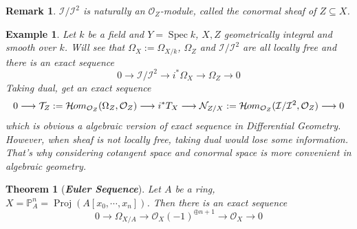 \documentclass{ctexart}
\newtheorem{remark}{Remark}[section]
\newtheorem{theorem}{Theorem}[section]
\newtheorem{example}{Example}[section]
\newcommand{\sheafhom}{\mathcal{H}\kern -.5pt om}
\newcommand{\spec}{\operatorname{Spec}}
\newcommand{\proj}{\operatorname{Proj}}
\begin{document}
\begin{remark}
    $\mathcal{I}/\mathcal{I}^{2}$ is naturally an $\mathcal{O}_{Z}$-module, called the conormal sheaf of $Z \subseteq X$.
\end{remark}
\begin{example}
    Let $k$ be a field and $Y = \spec k$, $X,Z$ geometrically integral and smooth over $k$.
    Will see that $\Omega_{X} := \Omega_{X/k}$, $\Omega_{Z}$ and $\mathcal{I}/\mathcal{I}^{2}$ are all locally free and there is an exact sequence
    \begin{equation*}
        0 \longrightarrow \mathcal{I}/\mathcal{I}^{2} \longrightarrow i^{\ast}\Omega_{X} \longrightarrow \Omega_{Z} \longrightarrow 0
    \end{equation*}
    Taking dual, get an exact sequence
    \begin{equation*}
        0 \longrightarrow \mathcal{T}_{Z} := \sheafhom_{\mathcal{O}_{Z}}(\Omega_{Z}, \mathcal{O}_{Z}) \longrightarrow i^{\ast}T_{X} \longrightarrow \mathcal{N}_{Z/X} := \sheafhom_{\mathcal{O}_{Z}}(\mathcal{I}/\mathcal{I}^{2}, \mathcal{O}_{Z}) \longrightarrow 0
    \end{equation*}
    which is obvious a algebraic version of exact sequence in Differential Geometry.
    However, when sheaf is not locally free, taking dual would lose some information.
    That's why considering cotangent space and conormal space is more convenient in algebraic geometry.
\end{example}
\begin{theorem}[\textbf{\emph{Euler Sequence}}]
    Let $A$ be a ring, $X = \mathbb{P}_{A}^{n} = \proj(A[x_{0}, \cdots, x_{n}])$.
    Then there is an exact sequence
    \begin{equation*}
        0 \longrightarrow \Omega_{X/A} \longrightarrow \mathcal{O}_{X}(-1)^{\oplus n + 1} \longrightarrow \mathcal{O}_{X} \longrightarrow 0
    \end{equation*}
\end{theorem}
\end{document}
